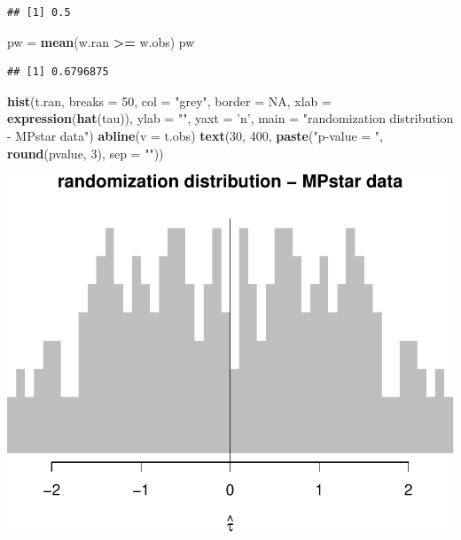 \documentclass[]{article}
\newenvironment{Shaded}{\begin{snugshade}}{\end{snugshade}}
\newcommand{\KeywordTok}[1]{\textcolor[rgb]{0.13,0.29,0.53}{\textbf{#1}}}
\newcommand{\DataTypeTok}[1]{\textcolor[rgb]{0.13,0.29,0.53}{#1}}
\newcommand{\DecValTok}[1]{\textcolor[rgb]{0.00,0.00,0.81}{#1}}
\newcommand{\StringTok}[1]{\textcolor[rgb]{0.31,0.60,0.02}{#1}}
\newcommand{\OtherTok}[1]{\textcolor[rgb]{0.56,0.35,0.01}{#1}}
\newcommand{\OperatorTok}[1]{\textcolor[rgb]{0.81,0.36,0.00}{\textbf{#1}}}
\newcommand{\NormalTok}[1]{#1}
\begin{document}
\begin{verbatim}
## [1] 0.5
\end{verbatim}

\begin{Shaded}
\begin{Highlighting}[]
\NormalTok{pw =}\StringTok{ }\KeywordTok{mean}\NormalTok{(w.ran }\OperatorTok{>=}\StringTok{ }\NormalTok{w.obs)}
\NormalTok{pw}
\end{Highlighting}
\end{Shaded}

\begin{verbatim}
## [1] 0.6796875
\end{verbatim}

\begin{Shaded}
\begin{Highlighting}[]
\KeywordTok{hist}\NormalTok{(t.ran, }\DataTypeTok{breaks =} \DecValTok{50}\NormalTok{, }\DataTypeTok{col =} \StringTok{"grey"}\NormalTok{, }\DataTypeTok{border =} \OtherTok{NA}\NormalTok{,}
     \DataTypeTok{xlab =} \KeywordTok{expression}\NormalTok{(}\KeywordTok{hat}\NormalTok{(tau)), }
     \DataTypeTok{ylab =} \StringTok{""}\NormalTok{, }\DataTypeTok{yaxt =} \StringTok{'n'}\NormalTok{, }
     \DataTypeTok{main =} \StringTok{"randomization distribution - MPstar data"}\NormalTok{)}
\KeywordTok{abline}\NormalTok{(}\DataTypeTok{v =}\NormalTok{ t.obs)}
\KeywordTok{text}\NormalTok{(}\DecValTok{30}\NormalTok{, }\DecValTok{400}\NormalTok{, }
     \KeywordTok{paste}\NormalTok{(}\StringTok{"p-value = "}\NormalTok{, }\KeywordTok{round}\NormalTok{(pvalue, }\DecValTok{3}\NormalTok{), }\DataTypeTok{sep =} \StringTok{""}\NormalTok{))}
\end{Highlighting}
\end{Shaded}

\includegraphics{hw3_files/figure-latex/unnamed-chunk-4-1.pdf}
\end{document}
